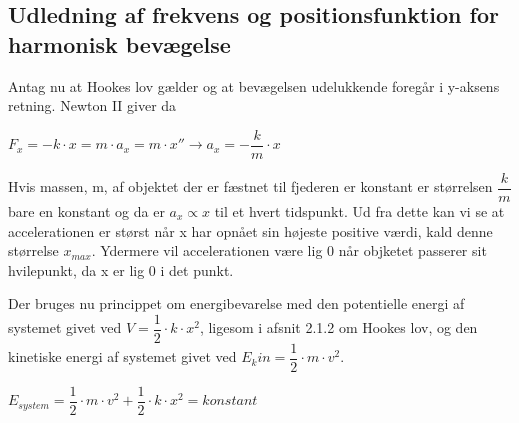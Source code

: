 \subsection{Udledning af frekvens og positionsfunktion for harmonisk bevægelse}

Antag nu at Hookes lov gælder og at bevægelsen udelukkende foregår i y-aksens retning. Newton II giver da 

\bigskip

\begin{center}
$F_x = -k \cdot x = m \cdot a_x = m \cdot x'' \rightarrow a_x = -\dfrac{k}{m} \cdot x$
\end{center}

\bigskip

Hvis massen, m, af objektet der er fæstnet til fjederen er konstant er størrelsen $\dfrac{k}{m}$ bare en konstant og da er $a_x \propto x$ til et hvert tidspunkt. Ud fra dette kan vi se at accelerationen er størst når x har opnået sin højeste positive værdi, kald denne størrelse $x_{max}$. Ydermere vil accelerationen være lig 0 når objketet passerer sit hvilepunkt, da x er lig 0 i det punkt.
\pagebreak

Der bruges nu princippet om energibevarelse med den potentielle energi af systemet givet ved $V=\dfrac{1}{2} \cdot k \cdot x^2$, ligesom i afsnit 2.1.2 om Hookes lov, og den kinetiske energi af systemet givet ved $E_kin = \dfrac{1}{2} \cdot m \cdot v^2$.

\bigskip

\begin{center}
$E_{system}=\dfrac{1}{2} \cdot m \cdot v^2 + \dfrac{1}{2} \cdot k \cdot x^2 = konstant$
\end{center}

